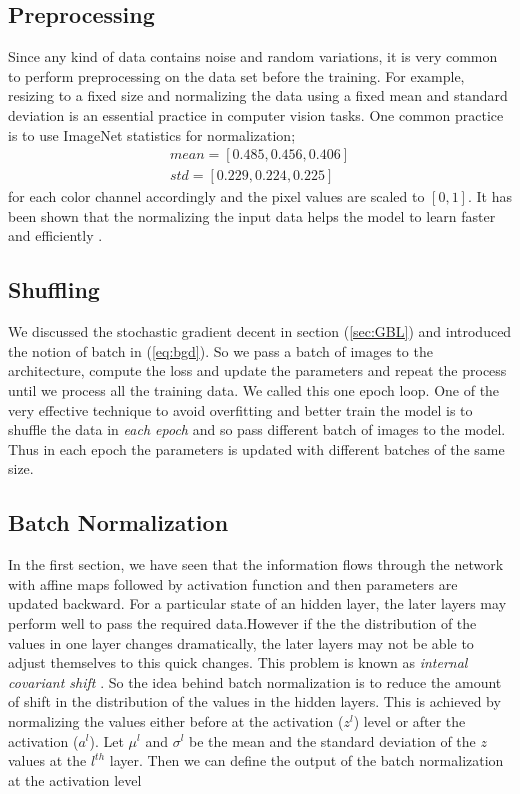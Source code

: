 \documentclass[12pt]{article}
\begin{document}
\subsection{Preprocessing}
Since any kind of data contains noise and random variations, it is very common to perform preprocessing on the data set before the training. For example, resizing to a fixed size and normalizing the data using a fixed mean and standard deviation is an essential practice in computer vision tasks. One common practice is to use ImageNet statistics for normalization;
\begin{align*}
mean = [ 0.485, 0.456, 0.406 ] \\
std = [ 0.229, 0.224, 0.225 ]
\end{align*} 
for each color channel accordingly and the pixel values are scaled to $[0,1]$. It has been shown that the normalizing the input data helps the model to learn faster and efficiently \cite{lecun}. 


\subsection{Shuffling}

We discussed the stochastic gradient decent in section (\ref{sec:GBL}) and introduced the notion of batch in (\ref{eq:bgd}). So we pass a batch of images to the architecture, compute the loss and update the parameters and repeat the process until we process all the training data. We called this one epoch loop. One of the very effective technique to avoid overfitting and better train the model is to shuffle the data in \textit{each epoch} and so pass different batch of images to the model. Thus in each epoch the parameters is updated with different batches of the same size. 


\subsection{Batch Normalization}
In the first section, we have seen that the information flows through the network with affine maps followed by activation function and then parameters are updated backward. For a particular state of an hidden layer, the later layers may perform well to pass the required data.However if the the distribution of the values in one layer changes dramatically, the later layers may not be able to adjust themselves to this quick changes. This problem is known as \textit{internal covariant shift} \cite{batchnorm}. So the idea behind batch normalization is to reduce the amount of shift in the distribution of the values in the hidden layers. This is achieved by normalizing the values either before at the activation ($z^{l}$) level or after the activation ($a^{l}$). Let $\mu^{l}$ and $\sigma^{l}$ be the mean and the standard deviation of the $z$ values at the $l^{th}$ layer. Then we can define the output of the batch normalization at the activation level 
\end{document}
